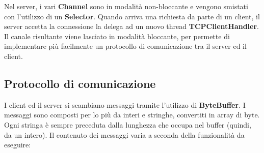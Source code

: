 \documentclass[11pt]{article}
\begin{document}
Nel server, i vari {\bf Channel} sono in modalità non-bloccante e vengono
smistati con l'utilizzo di un {\bf Selector}. Quando arriva una richiesta da
parte di un client, il server accetta la connessione la delega ad un nuovo
thread {\bf TCPClientHandler}. Il canale risultante viene lasciato in modalità
bloccante, per permette di implementare più facilmente un protocollo di
comunicazione tra il server ed il client.

\subsection{Protocollo di comunicazione}
I client ed il server si scambiano messaggi tramite l'utilizzo di
{\bf ByteBuffer}. I messaggi sono composti per lo più da interi e stringhe,
convertiti in array di byte. Ogni stringa è sempre preceduta dalla lunghezza che
occupa nel buffer (quindi, da un intero). Il contenuto dei messaggi varia a
seconda della funzionalità da eseguire:
\end{document}
